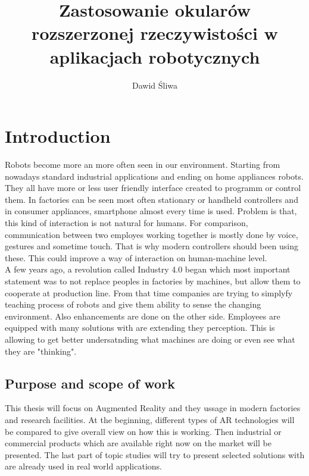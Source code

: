 \documentclass[printmode,en]{mgr}
\title{Zastosowanie okularów rozszerzonej rzeczywistości w aplikacjach
robotycznych}
\author{Dawid Śliwa}
\begin{document}

\maketitle %


\tableofcontents %

\chapter{Introduction}
Robots become more an more often seen in our environment. Starting from nowadays standard industrial applications and ending on home appliances robots. They all have more or less user friendly interface created to programm or control them. In factories can be seen most often stationary or handheld controllers and in consumer appliances, smartphone almost every time is used. Problem is that, this kind of interaction is not natural for humans. For comparison, communication between two employes working together is mostly done by voice, gestures and sometime touch. That is why modern controllers should been using these. This could improve a way of interaction on human-machine level. \\

A few years ago, a revolution called Industry 4.0 began which most important statement was to not replace peoples in factories by machines, but allow them to cooperate at production line. From that time companies are trying to simplyfy teaching process of robots and give them ability to sense the changing environment. Also enhancements are done on the other side. Employees are equipped with many solutions with are extending they perception. This is allowing to get better undersatnding what machines are doing or even see what they are "thinking".

\section{Purpose and scope of work}
This thesis will focus on Augmented Reality and they ussage in modern factories and research facilities. At the beginning, different types of AR technologies will be compared to give overall view on how this is working. Then industrial or commercial products which are available right now on the market will be presented. The last part of topic studies will try to present selected solutions with are already used in real world applications.\\
\end{document}
